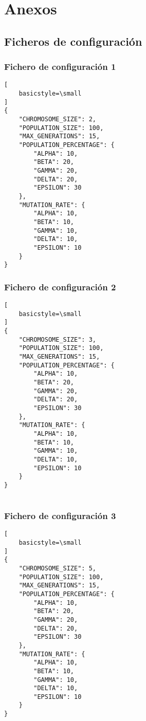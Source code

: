 \chapter{Anexos}

\section{Ficheros de configuración}

\subsection{Fichero de configuración 1} \label{subsect:config_file_1}

\begin{lstlisting}[
    basicstyle=\small
]
{
    "CHROMOSOME_SIZE": 2,
    "POPULATION_SIZE": 100,
    "MAX_GENERATIONS": 15,
    "POPULATION_PERCENTAGE": {
        "ALPHA": 10,
        "BETA": 20,
        "GAMMA": 20,
        "DELTA": 20,
        "EPSILON": 30
    },
    "MUTATION_RATE": {
        "ALPHA": 10,
        "BETA": 10,
        "GAMMA": 10,
        "DELTA": 10,
        "EPSILON": 10
    }
}

\end{lstlisting}

\subsection{Fichero de configuración 2} \label{subsect:config_file_2}

\begin{lstlisting}[
    basicstyle=\small
]
{
    "CHROMOSOME_SIZE": 3,
    "POPULATION_SIZE": 100,
    "MAX_GENERATIONS": 15,
    "POPULATION_PERCENTAGE": {
        "ALPHA": 10,
        "BETA": 20,
        "GAMMA": 20,
        "DELTA": 20,
        "EPSILON": 30
    },
    "MUTATION_RATE": {
        "ALPHA": 10,
        "BETA": 10,
        "GAMMA": 10,
        "DELTA": 10,
        "EPSILON": 10
    }
}
   
\end{lstlisting}

\subsection{Fichero de configuración 3} \label{subsect:config_file_3}

\begin{lstlisting}[
    basicstyle=\small
]
{
    "CHROMOSOME_SIZE": 5,
    "POPULATION_SIZE": 100,
    "MAX_GENERATIONS": 15,
    "POPULATION_PERCENTAGE": {
        "ALPHA": 10,
        "BETA": 20,
        "GAMMA": 20,
        "DELTA": 20,
        "EPSILON": 30
    },
    "MUTATION_RATE": {
        "ALPHA": 10,
        "BETA": 10,
        "GAMMA": 10,
        "DELTA": 10,
        "EPSILON": 10
    }
}
   
\end{lstlisting}

